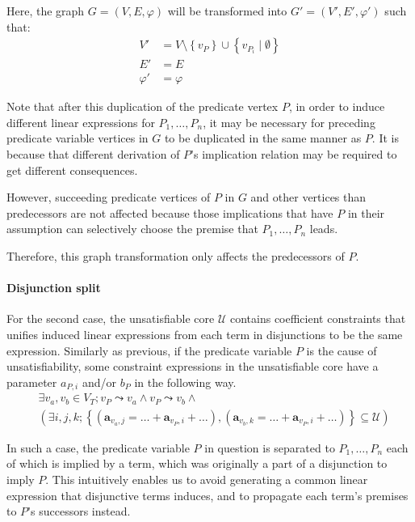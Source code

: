 Here, the graph $G=(V,E,\varphi)$ will be transformed into
$G'=(V',E',\varphi')$ such that:
\begin{align*}
V' & = V \setminus \left\lbrace v_P \right\rbrace \cup
  \left\lbrace v_{P_i} \mid \emptyset \right\rbrace \\
E' & = E \\
\varphi' & = \varphi
\end{align*}

Note that after this duplication of the predicate vertex $P$, in order
to induce different linear expressions for $P_1, \ldots, P_n$, it may
be necessary for preceding predicate variable vertices in $G$ to be
duplicated in the same manner as $P$. It is because that different
derivation of $P$'s implication relation may be required to get
different consequences.

However, succeeding predicate vertices of $P$ in $G$ and other
vertices than predecessors are not affected because those implications
that have $P$ in their assumption can selectively choose the premise
that $P_1, \ldots, P_n$ leads.

Therefore, this graph transformation only affects the predecessors of
$P$.

\paragraph{Disjunction split}
For the second case, the unsatisfiable core $\mathcal{U}$ contains
coefficient constraints that unifies induced linear expressions from
each term in disjunctions to be the same expression.  Similarly as
previous, if the predicate variable $P$ is the cause of
unsatisfiability, some constraint expressions in the unsatisfiable
core have a parameter $a_{P,i}$ and/or $b_P$ in the following way.
\begin{align*}
& \exists v_a, v_b \in V_T; v_P \leadsto v_a \wedge v_P \leadsto v_b \wedge \\
& \left( \exists i, j, k;
\left\lbrace \left( \mathbf{a}_{v_a,j} = \ldots + \mathbf{a}_{v_P,i} + \ldots \right),
\left( \mathbf{a}_{v_b,k} = \ldots + \mathbf{a}_{v_P,i} + \ldots \right)
\right\rbrace \subseteq \mathcal{U} \right)
\end{align*}

In such a case, the predicate variable $P$ in question is separated to
$P_1, \ldots, P_n$ each of which is implied by a term, which was
originally a part of a disjunction to imply $P$.  This intuitively
enables us to avoid generating a common linear expression that
disjunctive terms induces, and to propagate each term's premises to
$P$'s successors instead.


